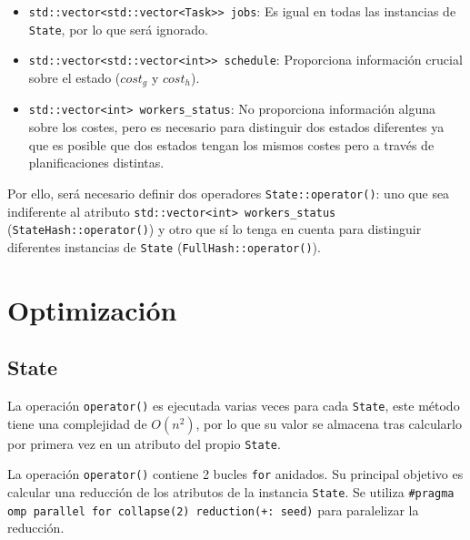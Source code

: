 \begin{itemize}[itemsep=0.25px]
    \item \lstinline{std::vector<std::vector<Task>> jobs}: Es igual en todas las
    instancias de \lstinline{State}, por lo que será ignorado.
    \item \lstinline{std::vector<std::vector<int>> schedule}: Proporciona
    información crucial sobre el estado ($cost_g$ y $cost_h$).
    \item \lstinline{std::vector<int> workers_status}: No proporciona
    información alguna sobre los costes,
    pero es necesario para distinguir dos estados diferentes
    ya que es posible que dos estados tengan los mismos costes pero a través de
    planificaciones distintas.
\end{itemize}

Por ello, será necesario definir dos operadores \lstinline{State::operator()}:
uno que sea indiferente al atributo \lstinline{std::vector<int> workers_status}
(\lstinline{StateHash::operator()})
y otro que sí lo tenga en cuenta para distinguir diferentes instancias de \lstinline{State}
(\lstinline{FullHash::operator()}).

\section{Optimización}

\subsection{State}

La operación \lstinline{operator()} es ejecutada varias veces para cada
\lstinline{State}, este método tiene una complejidad de $O(n^2)$,
por lo que su valor se almacena tras calcularlo por primera vez
en un atributo del propio \lstinline{State}.

La operación \lstinline{operator()} contiene 2 bucles \lstinline{for} anidados.
Su principal objetivo es calcular una reducción de los atributos de la instancia
\lstinline{State}.
Se utiliza \lstinline{#pragma omp parallel for collapse(2) reduction(+: seed)}
para paralelizar la reducción.

